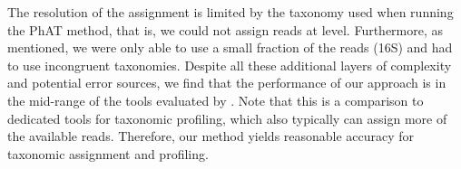 

The resolution of the assignment is limited by the taxonomy used when running the \ac{PhAT} method,
that is, we could not assign reads at  level.
Furthermore, as mentioned, we were only able to use a small fraction of the reads (16S) and had to use incongruent taxonomies.
Despite all these additional layers of complexity and potential error sources, 
we find that the performance of our approach is in the mid-range of the tools evaluated by .
Note that this is a comparison to dedicated tools for taxonomic profiling,
which also typically can assign more of the available reads.
Therefore, our method yields reasonable accuracy for taxonomic assignment and profiling.


